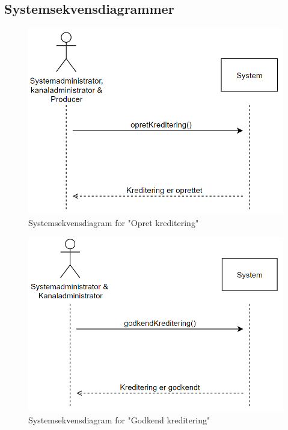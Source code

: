 \subsection{Systemsekvensdiagrammer}

\begin{figure}[H]
\centering
\includegraphics[scale=0.43]{figures/systemsekvensdiagrammer/opretKreditering.PNG}
\caption{Systemsekvensdiagram for "Opret kreditering"}
\label{fig:create_credit}
\end{figure}

\begin{figure}[H]
\centering
\includegraphics[scale=0.43]{figures/systemsekvensdiagrammer/godkendKreditering.PNG}
\caption{Systemsekvensdiagram for "Godkend kreditering"}
\label{fig:approve_credit}
\end{figure}

